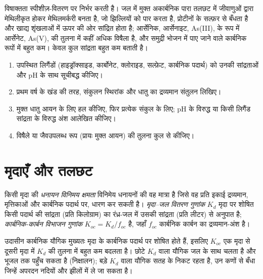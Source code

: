 विषाक्तता स्पीशीज़-वितरण पर निर्भर करती है। जल में मुक्त अकार्बनिक पारा
तलछट में जीवाणुओं द्वारा मेथिलीकृत होकर मेथिलमर्करी बनता है, जो झिल्लियों को पार करता है,
प्रोटीनों के सल्फ़र से बँधता है और खाद्य शृंखलाओं में ऊपर की ओर सांद्रित होता है; आर्सेनिक,
आर्सेनाइट, As(III), के रूप में आर्सेनेट, As(V), की तुलना में कहीं अधिक विषैला है, और समुद्री भोजन में पाए जाने वाले
कार्बनिक रूपों में बहुत कम। केवल कुल सांद्रता बहुत कम बताती है।

\begin{method}[किसी जल में किसी धातु का स्पीशीज़-वितरण]\label{met:b3:environmental-toxicology:speciation}
\begin{enumerate}
  \item उपस्थित लिगैंडों (हाइड्रॉक्साइड, कार्बोनेट, क्लोराइड, सल्फ़ेट, कार्बनिक
        पदार्थ) को उनकी सांद्रताओं और pH के साथ सूचीबद्ध कीजिए।
  \item प्रथम वर्ष के खंड की तरह, संकुलन स्थिरांक और धातु का द्रव्यमान
        संतुलन लिखिए।
  \item मुक्त धातु आयन के लिए हल कीजिए, फिर प्रत्येक संकुल के लिए; pH के विरुद्ध या किसी
        लिगैंड सांद्रता के विरुद्ध अंश आलेखित कीजिए।
  \item विषैले या जैवउपलब्ध रूप (प्रायः मुक्त आयन) की तुलना कुल से कीजिए।
\end{enumerate}
\end{method}

\section{मृदाएँ और तलछट}

\begin{definition}[मृदाओं में शोषण]\label{def:b3:environmental-toxicology:soil}
किसी मृदा की \emph{धनायन विनिमय क्षमता}
विनिमेय धनायनों की वह मात्रा है जिसे वह प्रति इकाई द्रव्यमान, मृत्तिकाओं और कार्बनिक
पदार्थ पर, धारण कर सकती है। \emph{मृदा--जल वितरण गुणांक}
$K_d$ मृदा पर शोषित किसी पदार्थ की सांद्रता (प्रति किलोग्राम) का रंध्र-जल में उसकी
सांद्रता (प्रति लीटर) से अनुपात है; \emph{कार्बनिक-कार्बन विभाजन गुणांक}
$K_{oc} = K_d/f_{oc}$ है, जहाँ $f_{oc}$ कार्बनिक कार्बन का द्रव्यमान-अंश है।
\end{definition}

उदासीन कार्बनिक यौगिक मुख्यतः मृदा के कार्बनिक पदार्थ पर शोषित होते हैं, इसलिए $K_{oc}$ एक मृदा से
दूसरी मृदा में $K_d$ की तुलना में बहुत कम बदलता है। छोटे $K_d$ वाला यौगिक जल के साथ चलता है
और भूजल तक पहुँच सकता है (निक्षालन); बड़े $K_d$ वाला यौगिक सतह के निकट रहता है,
उन कणों से बँधा जिन्हें अपरदन नदियों और झीलों में ले जा सकता है।

